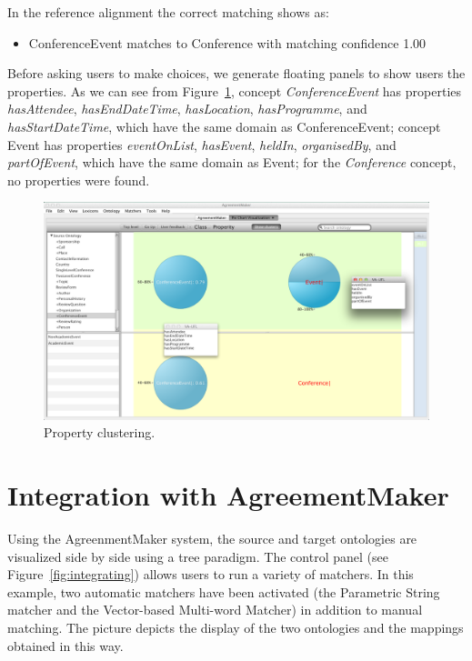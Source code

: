In the reference alignment the correct matching shows as: 
\begin{itemize}
\item ConferenceEvent matches to Conference with matching confidence 1.00 
\end{itemize}
Before asking users to make choices, we generate floating panels to
show users the properties. As we can see from
Figure~\ref{fig:property_clustering}, concept {\it ConferenceEvent\/}
has properties {\it hasAttendee}, {\it hasEndDateTime}, {\it
  hasLocation}, {\it hasProgramme}, and {\it hasStartDateTime}, which
have the same domain as ConferenceEvent; concept Event has properties
{\it eventOnList}, {\it hasEvent}, {\it heldIn}, {\it organisedBy},
and {\it partOfEvent}, which have the same domain as Event; for the
{\it Conference\/} concept, no properties were found.

\begin{figure}[htb]
	\centering
	\includegraphics[width=6.5in]{pics/property_cluster.png}
	\caption{Property clustering.}
	\label{fig:property_clustering}
\end{figure}

\section{Integration with AgreementMaker} %
\label{sub:integrating_with_agreementMaker}

Using the AgreenmentMaker system, the source and target ontologies are
visualized side by side using a tree paradigm. The control panel (see
Figure~\ref{fig:integrating}) allows users to run a variety of
matchers. In this example, two automatic matchers have been activated (the Parametric String matcher and
the Vector-based Multi-word Matcher) in addition to manual
matching. The picture depicts the display of the two ontologies and the mappings obtained in this way.

